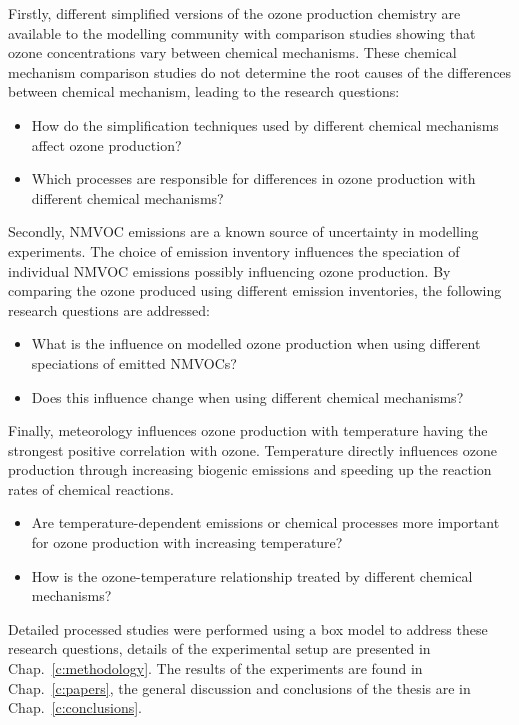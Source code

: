 Firstly, different simplified versions of the ozone production chemistry are available to the modelling community with comparison studies showing that ozone concentrations vary between chemical mechanisms.
These chemical mechanism comparison studies do not determine the root causes of the differences between chemical mechanism, leading to the research questions:
\begin{itemize}
	\item How do the simplification techniques used by different chemical mechanisms affect ozone production? 
    \item Which processes are responsible for differences in ozone production with different chemical mechanisms?
\end{itemize}

Secondly, NMVOC emissions are a known source of uncertainty in modelling experiments.
The choice of emission inventory influences the speciation of individual NMVOC emissions possibly influencing ozone production.
By comparing the ozone produced using different emission inventories, the following research questions are addressed:
\begin{itemize}
	\item What is the influence on modelled ozone production when using different speciations of emitted NMVOCs? 
    \item Does this influence change when using different chemical mechanisms?
\end{itemize}

Finally, meteorology influences ozone production with temperature having the strongest positive correlation with ozone.
Temperature directly influences ozone production through increasing biogenic emissions and speeding up the reaction rates of chemical reactions.
\begin{itemize}
    \item Are temperature-dependent emissions or chemical processes more important for ozone production with increasing temperature? 
    \item How is the ozone-temperature relationship treated by different chemical mechanisms?
\end{itemize}

Detailed processed studies were performed using a box model to address these research questions, details of the experimental setup are presented in Chap.~\ref{c:methodology}.
The results of the experiments are found in Chap.~\ref{c:papers}, the general discussion and conclusions of the thesis are in Chap.~\ref{c:conclusions}.
